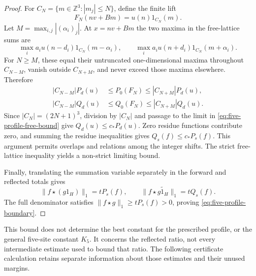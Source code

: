 \begin{proof}
For $C_N=\{m\in\mathbb Z^3:|m_j|\le N\}$, define the finite lift
\[
 F_N(nv+Bm)=u(n)1_{C_N}(m).
\]
Let $M=\max_{i,j}|(\alpha_i)_j|$. At $x=nv+Bm$ the two maxima
in the free-lattice sums are
\[
 \max_i a_iu(n-d_i)1_{C_N}(m-\alpha_i),\qquad
 \max_i a_iu(n+d_i)1_{C_N}(m+\alpha_i).
\]
For $N\ge M$, these equal their untruncated one-dimensional maxima
throughout $C_{N-M}$, vanish outside $C_{N+M}$, and never exceed
those maxima elsewhere. Therefore
\[
\begin{aligned}
 |C_{N-M}|P_d(u)&\le P_0(F_N)\le|C_{N+M}|P_d(u),\\
 |C_{N-M}|Q_d(u)&\le Q_0(F_N)\le|C_{N+M}|Q_d(u).
\end{aligned}
\]
Since $|C_N|=(2N+1)^3$, division by $|C_N|$ and passage to the
limit in \eqref{eq:five-profile-free-bound} give
$Q_d(u)\le c_*P_d(u)$. Zero residue functions contribute zero,
and summing the residue inequalities gives $Q_s(f)\le c_*P_s(f)$.
This argument permits overlaps and relations among the integer shifts.
The strict free-lattice inequality yields a non-strict limiting bound.

Finally, translating the summation variable separately in the forward
and reflected totals gives
\[
 \|f\star(g1_H)\|_1=tP_s(f),\qquad
 \|f\star\widetilde{g1_H}\|_1=tQ_s(f).
\]
The full denominator satisfies
$\|f\star g\|_1\ge tP_s(f)>0$, proving
\eqref{eq:five-profile-boundary}.
\end{proof}

This bound does not determine the best constant for the prescribed
profile, or the general five-site constant $K_5$. It concerns the
reflected ratio, not every intermediate estimate used to bound that
ratio. The following certificate calculation retains separate
information about those estimates and their unused margins.
